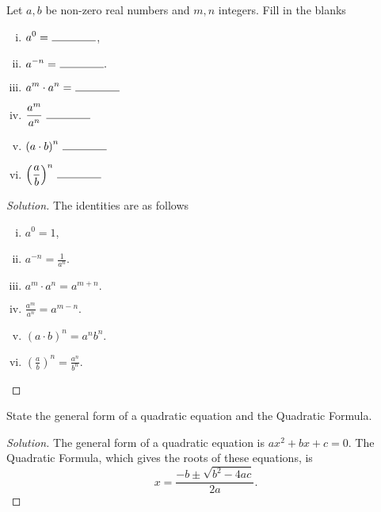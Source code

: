 \documentclass[12pt]{amsart}
\begin{document}
\begin{thm}[6 Points]\label{ex2}
  Let $a, b$ be non-zero real numbers and $m, n$ integers.
  Fill in the blanks
  \begin{enumerate}[(i)]
  \item
    $\displaystyle{a^0 =\ \line(1,0){40}}$,
  \item
    $\displaystyle{a^{-n} =\ \line(1,0){40}}.$
  \item
    $\displaystyle{a^m \cdot a^n =\ \line(1,0){40}}$
  \item
    $\displaystyle{\frac{a^m}{a^n}\ \line(1,0){40}}$
  \item
    $\displaystyle{\left(a \cdot b\right)^n\ \line(1,0){40}}$
  \item
    $\displaystyle{\left(\frac{a}{b}\right)^n\ \line(1,0){40}}$
  \end{enumerate}
  
  \begin{proof}[Solution]
    The identities are as follows
    \begin{enumerate}[(i)]
    \item
      $\displaystyle{a^0 = 1}$,
    \item
      $\displaystyle{a^{-n} = \frac{1}{a^n}}.$
    \item
      $\displaystyle{a^m \cdot a^n = a^{m + n}}.$
    \item
      $\displaystyle{\frac{a^m}{a^n} = a^{m - n}}.$
    \item
      $\displaystyle{\left( a \cdot b \right)^n = a^nb^n}.$
    \item
      $\displaystyle{\left( \frac{a}{b} \right)^n = \frac{a^n}{b^n}}.$
    \end{enumerate}
  \end{proof}
\end{thm}



\begin{thm}[2 Points]\label{ex3}
  State the general form of a quadratic equation and the Quadratic Formula.
  
  \begin{proof}[Solution]
    The general form of a quadratic equation is $ax^2 + bx + c = 0$.
    The Quadratic Formula, which gives the roots of these equations, is
    $$x = \frac{-b \pm \sqrt{b^2 - 4ac}}{2a}.$$
  \end{proof}
\end{thm}
\end{document}

